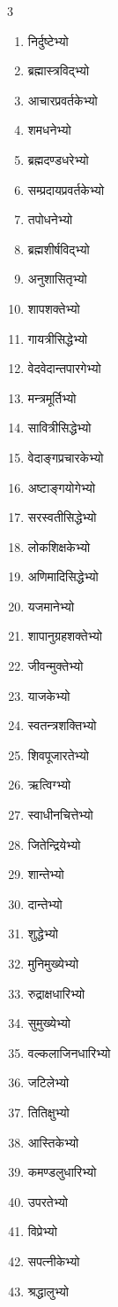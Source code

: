 \begin{multicols}{3}
\begin{enumerate}
\item निर्दुष्टेभ्यो
\item ब्रह्मास्त्रविद्भ्यो
\item आचारप्रवर्तकेभ्यो
\item शमधनेभ्यो
\item ब्रह्मदण्डधरेभ्यो
\item सम्प्रदायप्रवर्तकेभ्यो
\item तपोधनेभ्यो
\item ब्रह्मशीर्षविद्भ्यो
\item अनुशासितृभ्यो
\item शापशक्तेभ्यो
\item गायत्रीसिद्धेभ्यो
\item वेदवेदान्तपारगेभ्यो
\item मन्त्रमूर्तिभ्यो
\item सावित्रीसिद्धेभ्यो
\item वेदाङ्गप्रचारकेभ्यो
\item अष्टाङ्गयोगेभ्यो
\item सरस्वतीसिद्धेभ्यो
\item लोकशिक्षकेभ्यो
\item अणिमादिसिद्धेभ्यो
\item यजमानेभ्यो
\item शापानुग्रहशक्तेभ्यो
\item जीवन्मुक्तेभ्यो
\item याजकेभ्यो
\item स्वतन्त्रशक्तिभ्यो
\item शिवपूजारतेभ्यो
\item ऋत्विग्भ्यो
\item स्वाधीनचित्तेभ्यो
\item जितेन्द्रियेभ्यो
\item शान्तेभ्यो
\item दान्तेभ्यो
\item शुद्धेभ्यो
\item मुनिमुख्येभ्यो
\item रुद्राक्षधारिभ्यो
\item सुमुख्येभ्यो
\item वल्कलाजिनधारिभ्यो
\item जटिलेभ्यो
\item तितिक्षुभ्यो
\item आस्तिकेभ्यो
\item कमण्डलुधारिभ्यो
\item उपरतेभ्यो
\item विप्रेभ्यो
\item सपत्नीकेभ्यो
\item श्रद्धालुभ्यो

\end{enumerate}
\end{multicols}
